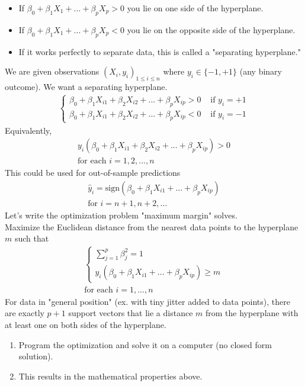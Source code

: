 \documentclass[12pt, letterpaper]{article}
\begin{document}
\begin{itemize}
    \item If $\beta_0 + \beta_1X_1 + ... + \beta_pX_p > 0$ you lie on one side of the hyperplane.
    \item If $\beta_0 + \beta_1X_1 + ... + \beta_pX_p < 0$ you lie on the opposite side of the hyperplane.
    \item If it works perfectly to separate data, this is called a "separating hyperplane."
\end{itemize}

\noindent We are given observations $(X_i, y_i)_{1\le i \le n}$ where $y_i \in \{-1,+1\}$ (any binary outcome).
We want a separating hyperplane.
\begin{align*}
    \begin{cases}
        \beta_0 + \beta_1 X_{i1} + \beta_2X_{i2} + ...+\beta_pX_{ip} >0 & \text{ if } y_i = +1 \\
        \beta_0 + \beta_1 X_{i1} + \beta_2X_{i2} + ...+\beta_pX_{ip} <0 & \text{ if } y_i = -1
    \end{cases}
\end{align*}
Equivalently, 
\begin{align*}
    y_i(\beta_0 + \beta_1 X_{i1} + \beta_2 X_{i2} + ... + \beta_p X_{ip}) > 0 \\
    \text{for each } i = 1,2,...,n
\end{align*}
This could be used for out-of-sample predictions
\begin{align*}
    \hat y_i = \text{sign}(\beta_0 + \beta_1 X_{i1} + ... + \beta_p X_{ip}) \\
    \text{for } i = n+1, n+2, ...
\end{align*}
Let's write the optimization problem "maximum margin" solves. \\
Maximize the Euclidean distance from the nearest data points to the hyperplane $m$ such that 
\begin{align*}
    \begin{cases}
        \sum_{j=1}^{p} \beta^2_j = 1 \\
        y_i (\beta_0 + \beta_1X_{i1} + ... + \beta_p X_{ip}) \ge m
    \end{cases} \\
    \text{for each } i = 1, ..., n
\end{align*}
For data in "general position" (ex. with tiny jitter added to data points), there are 
exactly $p+1$ support vectors that lie a distance $m$ from the hyperplane with at least 
one on both sides of the hyperplane.
\begin{enumerate}
    \item Program the optimization and solve it on a computer (no closed form solution).
    \item This results in the mathematical properties above.
\end{enumerate}
\end{document}
